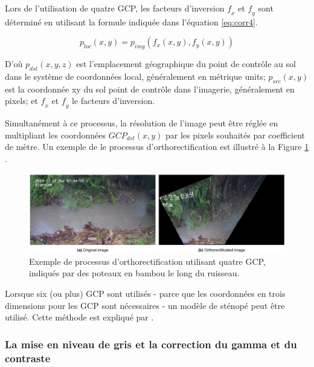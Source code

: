 \documentclass[
]{article}
\begin{document}
Lors de l'utilisation de quatre GCP, les facteurs d'inversion \(𝑓_𝑥\) et \(𝑓_𝑦\) sont
déterminé en utilisant la formule indiquée dans l'équation \eqref{eq:corr4}.

\begin{equation}
p_{loc}\left(x,y\right)=p_{img}\left(f_x\left(x,y\right), f_y\left(x,y\right)\right)
\label{eq:corr4}
\end{equation}

D'où \(𝑝_ {𝑑𝑠𝑡} \left (𝑥, 𝑦, 𝑧 \right)\) est l'emplacement géographique du
point de contrôle au sol dans le système de coordonnées local, généralement en métrique
units; \(𝑝_ {𝑠𝑟𝑐} \left (𝑥, 𝑦 \right)\) est la coordonnée xy du sol
point de contrôle dans l'imagerie, généralement en pixels; et \(𝑓_𝑥\) et \(𝑓_𝑦\) le
facteurs d'inversion.

Simultanément à ce processus, la résolution de l'image peut être réglée
en multipliant les coordonnées \(𝐺𝐶𝑃_ {𝑑𝑠𝑡} \left (𝑥, 𝑦 \right)\) par les
pixels souhaités par coefficient de mètre. Un exemple de
le processus d'orthorectification est illustré à la Figure \ref{fig:orthoafter} .



\begin{figure}
\includegraphics[width=1\linewidth]{images/ortho_after} \caption{Exemple de processus d'orthorectification utilisant quatre GCP, indiqués par des poteaux en bambou le long du ruisseau.}\label{fig:orthoafter}
\end{figure}

Lorsque six (ou plus) GCP sont utilisés - parce que les coordonnées en trois dimensions
pour les GCP sont nécessaires - un modèle de sténopé peut être utilisé. Cette méthode est
expliqué par \citep{jodeau_application_2008} .

\hypertarget{la-mise-en-niveau-de-gris-et-la-correction-du-gamma-et-du-contraste}{%
\subsubsection*{La mise en niveau de gris et la correction du gamma et du contraste}\label{la-mise-en-niveau-de-gris-et-la-correction-du-gamma-et-du-contraste}}
\end{document}
